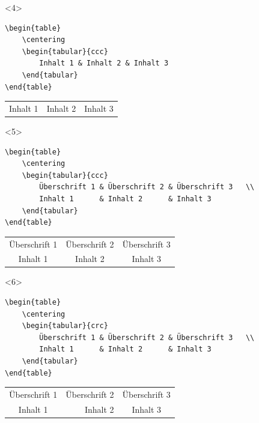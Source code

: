 \begin{frame}[fragile]
	\begin{onlyenv}
		\Code
		\begin{lstlisting}
\begin{table}
	\centering
	\begin{tabular}{ccc}
		Inhalt 1 & Inhalt 2 & Inhalt 3
	\end{tabular}
\end{table}
		\end{lstlisting}
		\Ausgabe
		\begin{outputbox}
			\begin{table}
				\centering
				\begin{tabular}{ccc}
					Inhalt 1 & Inhalt 2 & Inhalt 3
				\end{tabular}
			\end{table}
		\end{outputbox}
	\end{onlyenv}

	\begin{onlyenv}
		\Code
		\begin{lstlisting}
\begin{table}
	\centering
	\begin{tabular}{ccc}
		Überschrift 1 & Überschrift 2 & Überschrift 3	\\
		Inhalt 1      & Inhalt 2      & Inhalt 3
	\end{tabular}
\end{table}
		\end{lstlisting}
		\Ausgabe
		\begin{outputbox}
			\begin{table}
				\centering
				\begin{tabular}{ccc}
					Überschrift 1 & Überschrift 2 & Überschrift 3	\\
					Inhalt 1 & Inhalt 2 & Inhalt 3
				\end{tabular}
			\end{table}
		\end{outputbox}
	\end{onlyenv}

	\begin{onlyenv}
		\Code
		\begin{lstlisting}
\begin{table}
	\centering
	\begin{tabular}{crc}
		Überschrift 1 & Überschrift 2 & Überschrift 3	\\
		Inhalt 1      & Inhalt 2      & Inhalt 3
	\end{tabular}
\end{table}
		\end{lstlisting}
		\Ausgabe
		\begin{outputbox}
			\begin{table}
				\centering
				\begin{tabular}{crc}
					Überschrift 1 & Überschrift 2 & Überschrift 3	\\
					Inhalt 1 & Inhalt 2 & Inhalt 3
				\end{tabular}
			\end{table}
		\end{outputbox}
	\end{onlyenv}


\end{frame}
